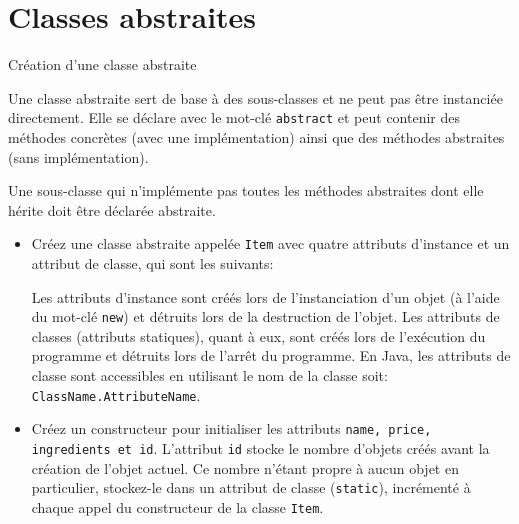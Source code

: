 \section{Classes abstraites}

\begin{Exercice}[15 minutes]{Création d'une classe abstraite}

	Une classe abstraite sert de base à des sous-classes et ne peut pas être instanciée directement. Elle se déclare avec le mot-clé \lstinline{abstract} et peut contenir des méthodes concrètes (avec une implémentation) ainsi que des méthodes abstraites (sans implémentation).

	Une sous-classe qui n'implémente pas toutes les méthodes abstraites dont elle hérite doit être déclarée abstraite.
	
	 
	
	\begin{itemize}
		\item Créez une classe abstraite appelée \lstinline{Item} avec quatre attributs d'instance et un attribut de classe, qui sont les suivants:
		 
		\begin{conseil}
			Les attributs d'instance sont créés lors de l'instanciation d'un objet (à l'aide du mot-clé \lstinline{new}) et détruits lors de la destruction de l'objet. Les attributs de classes (attributs statiques), quant à eux, sont créés lors de l'exécution du programme et détruits lors de l'arrêt du programme. En Java, les attributs de classe sont accessibles en utilisant le nom de la classe soit: \lstinline{ClassName.AttributeName}.
		\end{conseil}
		\item Créez un constructeur pour initialiser les attributs \lstinline{name, price, ingredients et id}. L'attribut \lstinline{id} stocke le nombre d'objets créés avant la création de l'objet actuel. 
		Ce nombre n'étant propre à aucun objet en particulier, stockez-le dans un attribut de classe (\lstinline|static|), incrémenté à chaque appel du constructeur de la classe \lstinline|Item|.


\end{itemize}
\end{Exercice}
